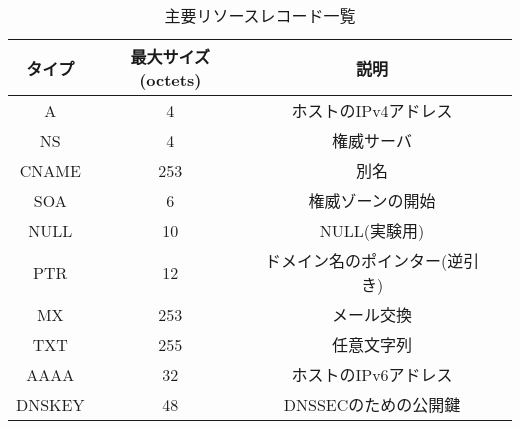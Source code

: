 \begin{table}[h]
 \centering
  \begin{tabular}{cccc}
    \toprule
		\textbf{タイプ} & \textbf{最大サイズ(octets)} & \textbf{説明}\\
    \midrule
    A & 4 &  ホストのIPv4アドレス \\
    NS & 4 & 権威サーバ \\
    CNAME & 253 & 別名 \\
    SOA & 6 & 権威ゾーンの開始 \\
    NULL & 10 & NULL(実験用) \\
    PTR & 12 & ドメイン名のポインター(逆引き) \\
    MX & 253 & メール交換 \\
    TXT & 255 & 任意文字列 \\
    AAAA & 32 & ホストのIPv6アドレス \\
    DNSKEY & 48 & DNSSECのための公開鍵\\
    \bottomrule
  \end{tabular}
 \caption{主要リソースレコード一覧}
 \label{tab:infil-rtype}
\end{table}
